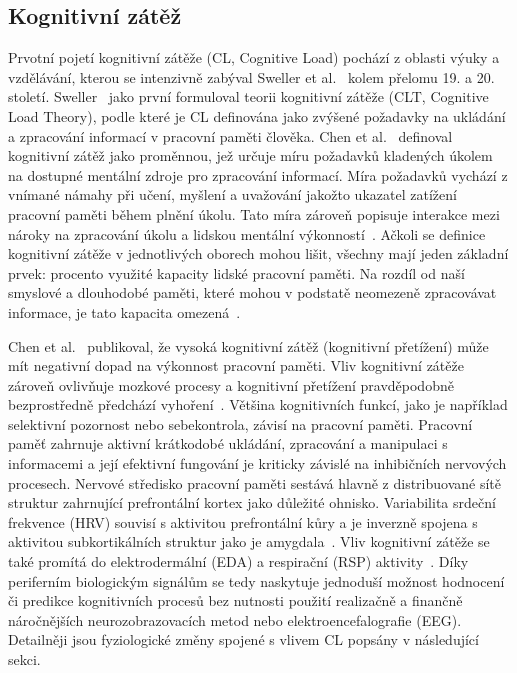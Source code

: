 \subsection{Kognitivní zátěž}
\label{subsection:kognitivni_zatez}
Prvotní pojetí kognitivní zátěže (\gls{CL}, Cognitive Load) pochází z oblasti
výuky a vzdělávání, kterou se intenzivně zabýval Sweller et
al.~\cite{Sweller1988,Sweller1998,Sweller2010} kolem přelomu 19. a 20. století.
Sweller~\cite{Sweller1988} jako první formuloval teorii kognitivní zátěže
(\gls{CLT}, Cognitive Load Theory), podle které je \gls{CL} definována jako
zvýšené požadavky na ukládání a zpracování informací v pracovní paměti člověka.
Chen et al.~\cite{Chen2016} definoval kognitivní zátěž jako proměnnou, jež
určuje míru požadavků kladených úkolem na dostupné mentální zdroje pro
zpracování informací. Míra požadavků vychází z vnímané námahy při učení, myšlení
a uvažování jakožto ukazatel zatížení pracovní paměti během plnění úkolu. Tato
míra zároveň popisuje interakce mezi nároky na zpracování úkolu a lidskou
mentální výkonností~\cite{Haapalainen2010}. Ačkoli se definice kognitivní zátěže
v jednotlivých oborech mohou lišit, všechny mají jeden základní prvek: procento
využité kapacity lidské pracovní paměti. Na rozdíl od naší smyslové a dlouhodobé
paměti, které mohou v podstatě neomezeně zpracovávat informace, je tato kapacita
omezená~\cite{Vanneste2021}.

Chen et al.~\cite{Chen2016} publikoval, že vysoká kognitivní zátěž (kognitivní
přetížení) může mít negativní dopad na výkonnost pracovní paměti. Vliv
kognitivní zátěže zároveň ovlivňuje mozkové procesy a kognitivní přetížení
pravděpodobně bezprostředně předchází vyhoření~\cite{Vanneste2021}. Většina
kognitivních funkcí, jako je například selektivní pozornost nebo sebekontrola,
závisí na pracovní paměti. Pracovní paměť zahrnuje aktivní krátkodobé ukládání,
zpracování a manipulaci s informacemi a její efektivní fungování je kriticky
závislé na inhibičních nervových procesech. Nervové středisko pracovní paměti
sestává hlavně z distribuované sítě struktur zahrnující prefrontální kortex jako
důležité ohnisko. Variabilita srdeční frekvence (\gls{HRV}) souvisí s aktivitou
prefrontální kůry a je inverzně spojena s aktivitou subkortikálních struktur
jako je amygdala~\cite{Thayer2009}. Vliv kognitivní zátěže se také promítá do
elektrodermální (\gls{EDA}) a respirační (\gls{RSP})
aktivity~\cite{Mogilever2018}. Díky periferním biologickým signálům se tedy
naskytuje jednoduší možnost hodnocení či predikce kognitivních procesů bez
nutnosti použití realizačně a finančně náročnějších neurozobrazovacích metod
nebo elektroencefalografie (\gls{EEG}). Detailněji jsou fyziologické změny
spojené s vlivem \gls{CL} popsány v následující sekci.

